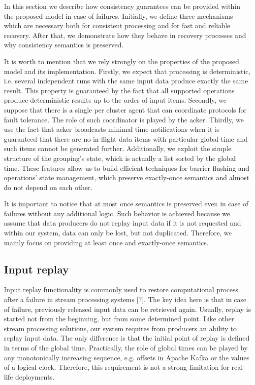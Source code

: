 
\label {fs-consistency-seciton}

In this section we describe how consistency guarantees can be provided within the proposed model in case of failures. Initially, we define three mechanisms which are necessary both for consistent processing and for fast and reliable recovery. After that, we demonstrate how they behave in recovery processes and why consistency semantics is preserved.

It is worth to mention that we rely strongly on the properties of the proposed model and its implementation. Firstly, we expect that processing is deterministic, i.e. several independent runs with the same input data produce exactly the same result. This property is guaranteed by the fact that all supported operations produce deterministic results up to the order of input items. Secondly, we suppose that there is a single per cluster agent that can coordinate protocols for fault tolerance. The role of such coordinator is played by the acker. Thirdly, we use the fact that acker broadcasts minimal time notifications when it is guaranteed that there are no in-flight data items with particular global time and such items cannot be generated further. Additionally, we exploit the simple structure of the grouping's state, which is actually a list sorted by the global time. These features allow us to build efficient techniques for barrier flushing and operations' state management, which preserve exactly-once semantics and almost do not depend on each other.

It is important to notice that at most once semantics is preserved even in case of failures without any additional logic. Such behavior is achieved because we assume that data producers do not replay input data if it is not requested and within our system, data can only be lost, but not duplicated. Therefore, we mainly focus on providing at least once and exactly-once semantics.

\subsection{Input replay}
Input replay functionality is commonly used to restore computational process after a failure in stream processing systems [?]. The key idea here is that in case of failure, previously released input data can be retrieved again. Usually, replay is started not from the beginning, but from some determined point. Like other stream processing solutions, our system requires from producers an ability to replay input data. The only difference is that the initial point of replay is defined in terms of the global time. Practically, the role of global times can be played by any monotonically increasing sequence, e.g. offsets in Apache Kafka or the values of a logical clock. Therefore, this requirement is not a strong limitation for real-life deployments.

